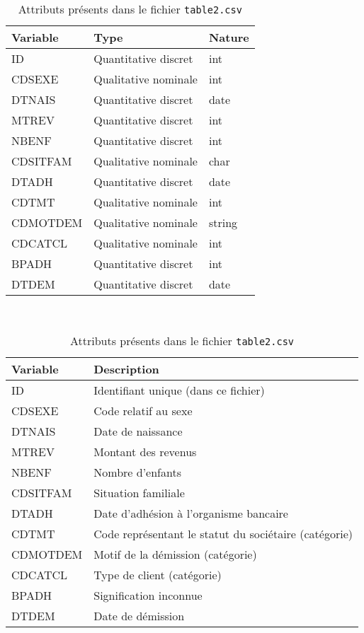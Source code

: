 \documentclass{ceri/sty/rapport}
\begin{document}
\begin{table}[htb!]
	\begin{tabular}{l l l}
		\hline
		\textbf{Variable} & \textbf{Type} & \textbf{Nature}	\\ 
		\hline
             ID & Quantitative discret & int \\
             CDSEXE & Qualitative nominale & int \\
             DTNAIS & Quantitative discret & date \\
             MTREV & Quantitative discret & int \\
             NBENF & Quantitative discret & int \\
             CDSITFAM & Qualitative nominale & char \\
             DTADH & Quantitative discret & date \\
             CDTMT & Qualitative nominale & int \\
             CDMOTDEM & Qualitative nominale & string \\
             CDCATCL & Qualitative nominale & int \\
             BPADH & Quantitative discret & int \\
             DTDEM & Quantitative discret & date \\
		\hline
	\end{tabular} \\
        \begin{tabular}{l l}
		\hline
		\textbf{Variable} & \textbf{Description} \\ 
		\hline
             ID & Identifiant unique (dans ce fichier) \\
             CDSEXE & Code relatif au sexe \\
             DTNAIS & Date de naissance \\
             MTREV & Montant des revenus \\
             NBENF & Nombre d’enfants \\
             CDSITFAM & Situation familiale \\
             DTADH & Date d’adhésion à l’organisme bancaire \\
             CDTMT & Code représentant le statut du sociétaire (catégorie) \\
             CDMOTDEM & Motif de la démission (catégorie) \\
             CDCATCL & Type de client (catégorie) \\
             BPADH & Signification inconnue \\
             DTDEM & Date de démission \\
		\hline
	\end{tabular}
	\caption[]{Attributs présents dans le fichier \texttt{table2.csv}}
	\label{tab:attrCSV2}
\end{table}
\end{document}
